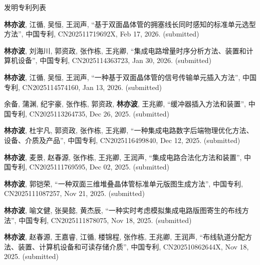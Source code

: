 \begin{rSection}{发明专利列表}



\begin{description}[font=\normalfont, rightmargin=2em]
    

\item[{[P33]}]{
        \textbf{林亦波}, 江循, 吴恒, 王润声, 
    ``基于双面晶体管的拥塞线长同时感知的标准单元选型方法'', 
    中国专利, CN202511719692X, Feb 17, 2026.
    (submitted)
}
            

\item[{[P32]}]{
        \textbf{林亦波}, 刘海川, 郭资政, 张作栋, 王兆卿, 
    ``集成电路增量时序分析方法、装置和计算机设备'', 
    中国专利, CN2025114363723, Jan 30, 2026.
    (submitted)
}
            

\item[{[P31]}]{
        \textbf{林亦波}, 江循, 吴恒, 王润声, 
    ``一种基于双面晶体管的信号传输单元插入方法'', 
    中国专利, CN2025114574160, Jan 13, 2026.
    (submitted)
}
            

\item[{[P30]}]{
        余备, 蒲渊, 纪宇豪, 张作栋, 郭资政, \textbf{林亦波}, 王兆卿, 
    ``缓冲器插入方法和装置'', 
    中国专利, CN2025113264735, Dec 26, 2025.
    (submitted)
}
            

\item[{[P29]}]{
        \textbf{林亦波}, 杜宇凡, 郭资政, 张作栋, 王兆卿, 
    ``一种集成电路数字后端物理优化方法、设备、介质及产品'', 
    中国专利, CN2025116499840, Dec 12, 2025.
    (submitted)
}
            

\item[{[P28]}]{
        \textbf{林亦波}, 麦景, 赵春源, 张作栋, 王兆卿, 王润声, 
    ``集成电路合法化方法和装置'', 
    中国专利, CN2025111769595, Dec 02, 2025.
    (submitted)
}
            

\item[{[P27]}]{
        \textbf{林亦波}, 郭铠荣, 
    ``一种双面三维堆叠晶体管标准单元版图生成方法'', 
    中国专利, CN2025111087257, Nov 21, 2025.
    (submitted)
}
            

\item[{[P26]}]{
        \textbf{林亦波}, 喻文健, 张昊懿, 黄杰辰, 
    ``一种实时考虑模拟集成电路版图寄生的布线方法'', 
    中国专利, CN2025111878075, Nov 18, 2025.
    (submitted)
}
            

\item[{[P25]}]{
        \textbf{林亦波}, 赵春源, 王嘉睿, 江循, 楼锦程, 张作栋, 王兆卿, 王润声, 
    ``布线轨道分配方法、装置、计算机设备和可读存储介质'', 
    中国专利, CN202510862644X, Nov 18, 2025.
    (submitted)
}
            


\end{description}
\end{rSection}
